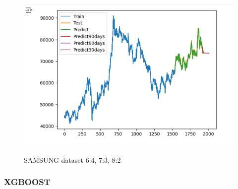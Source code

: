 \documentclass[conference]{IEEEtran}
\begin{document}
\begin{figure}[H]
\begin{minipage}{0.15\textwidth}
    \label{fig:2}
    \end{minipage}%
    \begin{minipage}{0.15\textwidth}
    \centering
    \includegraphics[width=1\textwidth]{Image/GradientBoosting/SAMSUNG_8_2_GradientBoostingRegressor.png}

    \label{fig:3}
    \end{minipage}
    \caption{SAMSUNG dataset 6:4, 7:3, 8:2}
\end{figure}



\subsubsection{XGBOOST}
\end{document}
